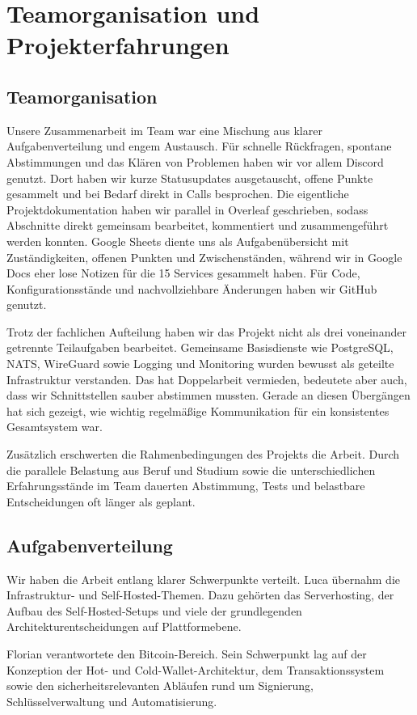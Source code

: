 
\chapter{Teamorganisation und Projekterfahrungen}

\section{Teamorganisation}
Unsere Zusammenarbeit im Team war eine Mischung aus klarer Aufgabenverteilung und engem Austausch. Für schnelle Rückfragen, spontane Abstimmungen und das Klären von Problemen haben wir vor allem Discord genutzt. Dort haben wir kurze Statusupdates ausgetauscht, offene Punkte gesammelt und bei Bedarf direkt in Calls besprochen. Die eigentliche Projektdokumentation haben wir parallel in Overleaf geschrieben, sodass Abschnitte direkt gemeinsam bearbeitet, kommentiert und zusammengeführt werden konnten. Google Sheets diente uns als Aufgabenübersicht mit Zuständigkeiten, offenen Punkten und Zwischenständen, während wir in Google Docs eher lose Notizen für die 15 Services gesammelt haben. Für Code, Konfigurationsstände und nachvollziehbare Änderungen haben wir GitHub genutzt.

Trotz der fachlichen Aufteilung haben wir das Projekt nicht als drei voneinander getrennte Teilaufgaben bearbeitet. Gemeinsame Basisdienste wie PostgreSQL, \ac{NATS}, WireGuard sowie Logging und Monitoring wurden bewusst als geteilte Infrastruktur verstanden. Das hat Doppelarbeit vermieden, bedeutete aber auch, dass wir Schnittstellen sauber abstimmen mussten. Gerade an diesen Übergängen hat sich gezeigt, wie wichtig regelmäßige Kommunikation für ein konsistentes Gesamtsystem war.

Zusätzlich erschwerten die Rahmenbedingungen des Projekts die Arbeit. Durch die parallele Belastung aus Beruf und Studium sowie die unterschiedlichen Erfahrungsstände im Team dauerten Abstimmung, Tests und belastbare Entscheidungen oft länger als geplant.

\section{Aufgabenverteilung}
Wir haben die Arbeit entlang klarer Schwerpunkte verteilt. Luca übernahm die Infrastruktur- und Self-Hosted-Themen. Dazu gehörten das Serverhosting, der Aufbau des Self-Hosted-Setups und viele der grundlegenden Architekturentscheidungen auf Plattformebene.

Florian verantwortete den Bitcoin-Bereich. Sein Schwerpunkt lag auf der Konzeption der Hot- und Cold-Wallet-Architektur, dem Transaktionssystem sowie den sicherheitsrelevanten Abläufen rund um Signierung, Schlüsselverwaltung und Automatisierung.

